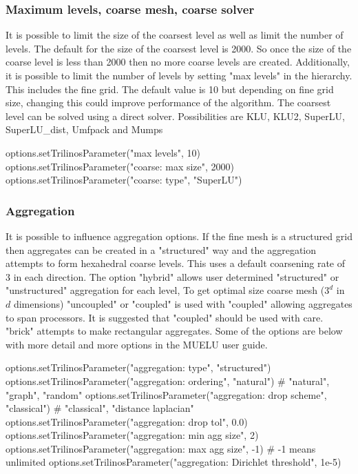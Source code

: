 \subsubsection{Maximum levels, coarse mesh, coarse solver}
It is possible to limit the size of the coarsest level as well as limit the number of levels.  The default for the size of the coarsest level is 2000.  So once the size of the coarse level is less than 2000 then no more coarse levels are created.  Additionally, it is possible to limit the number of levels by setting "max levels" in the hierarchy.  This includes the fine grid.  The default value is 10 but depending on fine grid size, changing this could improve performance of the algorithm.  The coarsest level can be solved using a direct solver.  Possibilities are KLU, KLU2, SuperLU, SuperLU\_dist, Umfpack and Mumps

\begin{python}
options.setTrilinosParameter("max levels", 10)         
options.setTrilinosParameter("coarse: max size", 2000)
options.setTrilinosParameter("coarse: type", "SuperLU")
\end{python}


\subsubsection{Aggregation}
It is possible to influence aggregation options.  If the fine mesh is a structured grid then aggregates can be created in a  "structured" way and the aggregation attempts to form hexahedral coarse levels.  This uses a default coarsening rate of 3 in each direction. The option "hybrid" allows user determined "structured" or "unstructured" aggregation for each level, To get optimal size coarse mesh ($3^d$ in $d$ dimensions) "uncoupled" or "coupled" is used with "coupled" allowing aggregates to span processors.  It is suggested that "coupled" should be used with care.  "brick" attempts to make rectangular aggregates. Some of the options are below with more detail and more options in the MUELU user guide.   
\begin{python}
options.setTrilinosParameter("aggregation: type", "structured")
options.setTrilinosParameter("aggregation: ordering", "natural")
                                                 # "natural", "graph", "random"
options.setTrilinosParameter("aggregation: drop scheme", "classical")
                                                 # "classical", "distance laplacian" 
options.setTrilinosParameter("aggregation: drop tol", 0.0)
options.setTrilinosParameter("aggregation: min agg size", 2)
options.setTrilinosParameter("aggregation: max agg size", -1) 
                                                # -1 means unlimited    
options.setTrilinosParameter("aggregation: Dirichlet threshold", 1e-5)
\end{python}
    
